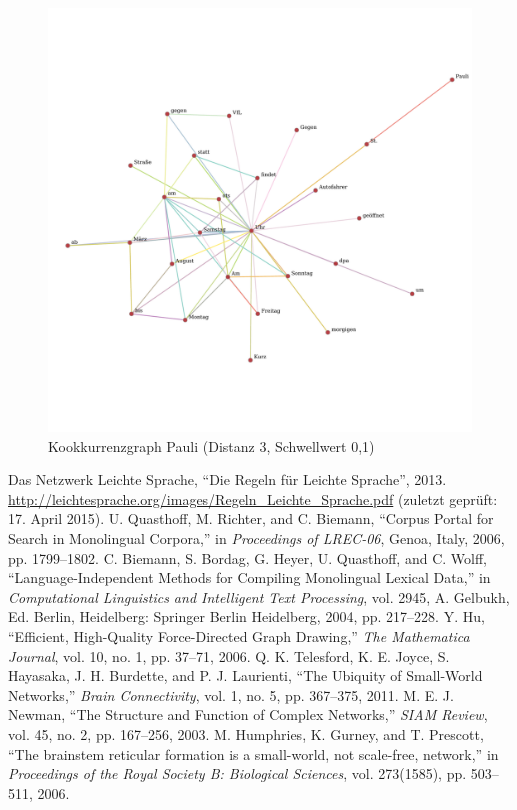 \documentclass[11pt, a4paper]{article}
\begin{document}
\begin{figure}[hp!]
    \centering
        \includegraphics[scale=.4]{../../data/results/longpath_wordgraphs/den/graph_Pauli.pdf}
    \caption{Kookkurrenzgraph Pauli (Distanz 3, Schwellwert 0,1)}
    \label{fig:lp-pauli}
\end{figure}


\pagebreak
\begin{thebibliography}{9}
     Das Netzwerk Leichte Sprache, “Die Regeln für Leichte Sprache”, 2013. \url{http://leichtesprache.org/images/Regeln_Leichte_Sprache.pdf} (zuletzt geprüft: 17. April 2015).
    U. Quasthoff, M. Richter, and C. Biemann, “Corpus Portal for Search in Monolingual Corpora,” in \emph{Proceedings of LREC-06}, Genoa, Italy, 2006, pp. 1799–1802.
     C. Biemann, S. Bordag, G. Heyer, U. Quasthoff, and C. Wolff, “Language-Independent Methods for Compiling Monolingual Lexical Data,” in \emph{Computational Linguistics and Intelligent Text Processing}, vol. 2945, A. Gelbukh, Ed. Berlin, Heidelberg: Springer Berlin Heidelberg, 2004, pp. 217–228.
     Y. Hu, “Efficient, High-Quality Force-Directed Graph Drawing,” \emph{The Mathematica Journal}, vol. 10, no. 1, pp. 37–71, 2006.
    Q. K. Telesford, K. E. Joyce, S. Hayasaka, J. H. Burdette, and P. J. Laurienti, “The Ubiquity of Small-World Networks,” \emph{Brain Connectivity}, vol. 1, no. 5, pp. 367–375, 2011.
     M. E. J. Newman, “The Structure and Function of Complex Networks,” \emph{SIAM Review}, vol. 45, no. 2, pp. 167–256, 2003.
    M. Humphries, K. Gurney, and T. Prescott, “The brainstem reticular formation is a small-world, not scale-free, network,” in \emph{Proceedings of the Royal Society B: Biological Sciences}, vol. 273(1585), pp. 503–511, 2006.
\end{thebibliography}

\listoftables

\listoffigures
\end{document}
